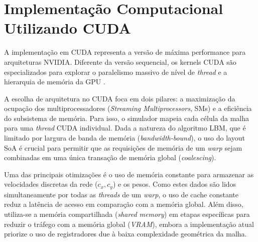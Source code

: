 
\section{Implementação Computacional Utilizando CUDA}\label{sec:implementacao-computacional-utilizando-cuda}

A implementação em CUDA representa a versão de máxima performance para arquiteturas NVIDIA. Diferente da versão sequencial, os kernels CUDA são especializados para explorar o paralelismo massivo de nível de \textit{thread} e a hierarquia de memória da GPU \parencite{Chakrabarti2012}.

A escolha de arquitetura no CUDA foca em dois pilares: a maximização da ocupação dos multiprocessadores (\textit{Streaming Multiprocessors}, SMs) e a eficiência do subsistema de memória.
Para isso, o simulador mapeia cada célula da malha para uma \textit{thread} CUDA individual.
Dada a natureza do algoritmo LBM, que é limitado por largura de banda de memória (\textit{bandwidth-bound}), o uso do layout SoA é crucial para permitir que as requisições de memória de um \textit{warp} sejam combinadas em uma única transação de memória global (\textit{coalescing}).

Uma das principais otimizações é o uso de memória constante para armazenar as velocidades discretas da rede ($c_x, c_y$) e os pesos.
Como estes dados são lidos simultaneamente por todas as \textit{threads} de um \textit{warp}, o uso de cache constante reduz a latência de acesso em comparação com a memória global.
Além disso, utiliza-se a memória compartilhada (\textit{shared memory}) em etapas específicas para reduzir o tráfego com a memória global (\textit{VRAM}), embora a implementação atual priorize o uso de registradores due à baixa complexidade geométrica da malha.

